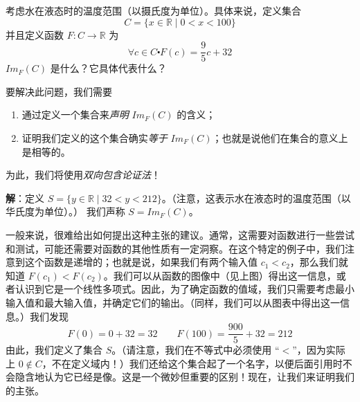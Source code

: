 \begin{example}
    考虑水在液态时的温度范围（以摄氏度为单位）。具体来说，定义集合
    \[C = \{x \in \mathbb{R} \mid 0 < x < 100\}\]
    并且定义函数 $F : C \to \mathbb{R}$ 为
    \[\forall c \in C \centerdot F(c) = \frac{9}{5}c + 32\]
    $Im_F (C)$ 是什么？它具体代表什么？

    要解决此问题，我们需要
    \begin{enumerate}[label=(\alph*)]
        \item 通过定义一个集合来\emph{声明} $Im_F (C)$ 的含义；
        \item 证明我们定义的这个集合确实\emph{等于} $Im_F (C)$；也就是说他们在集合的意义上是相等的。 
    \end{enumerate}
    为此，我们将使用\emph{双向包含论证法}！

    \textbf{解}：定义 $S = \{y \in \mathbb{R} \mid 32 < y < 212\}$。（注意，这表示水在液态时的温度范围（以华氏度为单位）。） 我们声称 $S = Im_F (C)$。

    \begin{center}
    \end{center}

    一般来说，很难给出如何提出这种主张的建议。通常，这需要对函数进行一些尝试和测试，可能还需要对函数的其他性质有一定洞察。在这个特定的例子中，我们注意到这个函数是递增的；也就是说，如果我们有两个输入值 $c_1 < c_2$，那么我们就知道 $F(c_1) < F(c_2)$。我们可以从函数的图像中（见上图）得出这一信息，或者认识到它是一个线性多项式。因此，为了确定函数的值域，我们只需要考虑最小输入值和最大输入值，并确定它们的输出。（同样，我们可以从图表中得出这一信息。）我们发现
    \[F(0) = 0 + 32 = 32 \qquad F(100) = \frac{900}{5} + 32 = 212\]
    由此，我们定义了集合 $S$。（请注意，我们在不等式中必须使用 ``$<$''，因为实际上 $0 \notin C$，不在定义域内！）我们还给这个集合起了一个名字，以便后面引用时不会隐含地认为它已经是像。这是一个微妙但重要的区别！现在，让我们来证明我们的主张。


\end{example}
